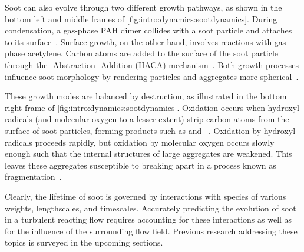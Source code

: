Soot can also evolve through two different growth pathways, as shown in the bottom left and middle frames of \cref{fig:intro:dynamics:sootdynamics}. During condensation, a gas-phase PAH dimer collides with a soot particle and attaches to its surface~\cite{hmom2009,blanquart2009}. Surface growth, on the other hand, involves reactions with gas-phase acetylene. Carbon atoms are added to the surface of the soot particle through the -Abstraction -Addition (HACA) mechanism~\cite{frenklach1985,frenklach1991}. Both growth processes influence soot morphology by rendering particles and aggregates more spherical~\cite{mitchell1998,mitchell2003,park2003}.

These growth modes are balanced by destruction, as illustrated in the bottom right frame of \cref{fig:intro:dynamics:sootdynamics}. Oxidation occurs when hydroxyl radicals (and molecular oxygen to a lesser extent) strip carbon atoms from the surface of soot particles, forming products such as  and ~\cite{kazakov1995,neoh1981,stanmore2001}. Oxidation by hydroxyl radicals proceeds rapidly, but oxidation by molecular oxygen occurs slowly enough such that the internal structures of large aggregates are weakened. This leaves these aggregates susceptible to breaking apart in a process known as fragmentation~\cite{mueller2011,neoh1985}.

Clearly, the lifetime of soot is governed by interactions with species of various weights, lengthscales, and timescales. Accurately predicting the evolution of soot in a turbulent reacting flow requires accounting for these interactions as well as for the influence of the surrounding flow field. Previous research addressing these topics is surveyed in the upcoming sections.
